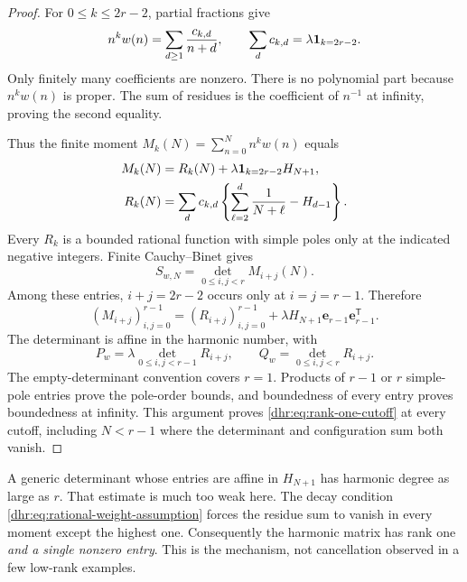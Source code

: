 \begin{proof}
For $0\leq k\leq2r-2$, partial fractions give
\begin{equation}\label{dhr:eq:moment-residues}
 n^kw(n)=\sum_{d\geq1}\frac{c_{k,d}}{n+d},\qquad
 \sum_dc_{k,d}=\lambda\mathbf1_{k=2r-2}.
\end{equation}
Only finitely many coefficients are nonzero. There is no polynomial
part because $n^kw(n)$ is proper. The sum of residues is the coefficient
of $n^{-1}$ at infinity, proving the second equality.

Thus the finite moment $M_k(N)=\sum_{n=0}^Nn^kw(n)$ equals
\begin{align}
 M_k(N)&=R_k(N)+\lambda\mathbf1_{k=2r-2}H_{N+1},\notag\\
 R_k(N)&=\sum_dc_{k,d}\left\{
       \sum_{\ell=2}^{d}\frac1{N+\ell}-H_{d-1}\right\}.
 \label{dhr:eq:finite-moments}
\end{align}
Every $R_k$ is a bounded rational function with simple poles only
at the indicated negative integers. Finite Cauchy--Binet gives
\begin{equation}\label{dhr:eq:hankel-cutoff}
 S_{w,N}=\det_{0\leq i,j<r}M_{i+j}(N).
\end{equation}
Among these entries, $i+j=2r-2$ occurs only at $i=j=r-1$.
Therefore
\begin{equation}\label{dhr:eq:rank-one-matrix}
 (M_{i+j})_{i,j=0}^{r-1}
 =(R_{i+j})_{i,j=0}^{r-1}
       +\lambda H_{N+1}\bm e_{r-1}\bm e_{r-1}^{\mathsf T}.
\end{equation}
The determinant is affine in the harmonic number, with
\begin{equation}\label{dhr:eq:PQ-det}
 P_w=\lambda\det_{0\leq i,j<r-1}R_{i+j},\qquad
 Q_w=\det_{0\leq i,j<r}R_{i+j}.
\end{equation}
The empty-determinant convention covers $r=1$. Products of $r-1$
or $r$ simple-pole entries prove the pole-order bounds, and boundedness
of every entry proves boundedness at infinity. This argument proves
\eqref{dhr:eq:rank-one-cutoff} at every cutoff, including $N<r-1$
where the determinant and configuration sum both vanish.
\end{proof}

\begin{remark}
A generic determinant whose entries are affine in $H_{N+1}$ has
harmonic degree as large as $r$. That estimate is much too weak here.
The decay condition \eqref{dhr:eq:rational-weight-assumption} forces
the residue sum to vanish in every moment except the highest one.
Consequently the harmonic matrix has rank one \emph{and a single
nonzero entry}. This is the mechanism, not cancellation observed in
a few low-rank examples.
\end{remark}


